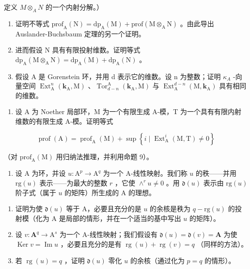 定义 \(M \otimes_A N\) 的一个内射分解。）

\begin{enumerate}
\def\labelenumi{\alph{enumi})}
\setcounter{enumi}{1}
\item
  证明不等式 \(\mathrm{prof}_{\mathrm{A}}(\mathrm{N}) = \mathrm{dp}_{\mathrm{A}}(\mathrm{M}) + \mathrm{prof}(\mathrm{M} \otimes_{\mathrm{A}} \mathrm{N})\) 。由此导出 Auslander-Buchsbaum 定理的另一个证明。
\item
  进而假设 N 具有有限投射维数。证明等式 \(\mathrm{dp}_{\mathrm{A}}(\mathrm{M}\otimes_{\mathrm{A}}\mathrm{N})=\mathrm{dp}_{\mathrm{A}}(\mathrm{M})+\mathrm{dp}_{\mathrm{A}}(\mathrm{N})\) 。
\item
  假设 A 是 Gorenstein 环，并用 d 表示它的维数。设 n 为整数；证明 \(\kappa_{A}\) -向量空间 \(\operatorname{Ext}_{\mathrm{A}}^{n}(\mathbf{k}_{\mathrm{A}},\mathrm{M})\) 、\(\operatorname{Tor}_{d-n}^{\mathrm{A}}(\mathbf{k}_{\mathrm{A}},\mathrm{M})\) 与 \(\operatorname{Ext}_{\mathrm{A}}^{d-n}(\mathrm{M},\mathbf{k}_{\mathrm{A}})\) 具有相同的维数。
\end{enumerate}

\begin{enumerate}
\def\labelenumi{\arabic{enumi})}
\setcounter{enumi}{6}
\tightlist
\item
  设 A 为 Noether 局部环，M 为一个有限生成 A-模，T 为一个具有有限内射维数的有限生成 A-模。证明等式
\end{enumerate}

\[
\operatorname{prof} (\mathrm{A}) = \operatorname{prof} _ {\mathrm{A}} (\mathrm{M}) + \sup \left\{i \mid \operatorname{Ext} _ {\mathrm{A}} ^ {i} (\mathrm{M}, \mathrm{T}) \neq 0 \right\}
\]

（对 \(\mathrm{prof}_{\mathrm{A}}(\mathrm{M})\) 用归纳法推理，并利用命题 9）。

\begin{enumerate}
\def\labelenumi{\arabic{enumi})}
\setcounter{enumi}{7}
\tightlist
\item
  设 A 为环，并设 \(u: \mathrm{A}^p \to \mathrm{A}^q\) 为一个 A-线性映射。我们称 \(u\) 的秩——并用 \(\text{rg}(u)\) 表示——为最大的整数 \(r\) ，它使 \(\wedge^r u \neq 0\) 。用 \(\mathfrak{d}(u)\) 表示由 \(\text{rg}(u)\) 阶子式（属于 \(u\) 的矩阵）所生成的 A 的理想。
\end{enumerate}

\begin{enumerate}
\def\labelenumi{\alph{enumi})}
\item
  证明为使 \(\mathfrak{d}(u)\) 等于 A，必要且充分的是 \(u\) 的余核是秩为 \(q - \mathrm{rg}(u)\) 的投射模（化为 \(\mathrm{A}\) 是局部的情形，并在一个适当的基中写出 \(u\) 的矩阵）。
\item
  设 \(v: \mathbf{A}^q \to \mathrm{A}^s\) 为一个 A-线性映射；我们假设有 \(\mathfrak{d}(u) = \mathfrak{d}(v) = \mathbf{A}\) 为使 \(\operatorname{Ker} v = \operatorname{Im} u\) ，必要且充分的是有 \(\operatorname{rg}(u) + \operatorname{rg}(v) = q\) （同样的方法）。
\item
  若 \(\operatorname{rg}(u) = q\) ，证明 \(\mathfrak{d}(u)\) 零化 \(u\) 的余核（通过化为 \(p = q\) 的情形）。
\end{enumerate}

